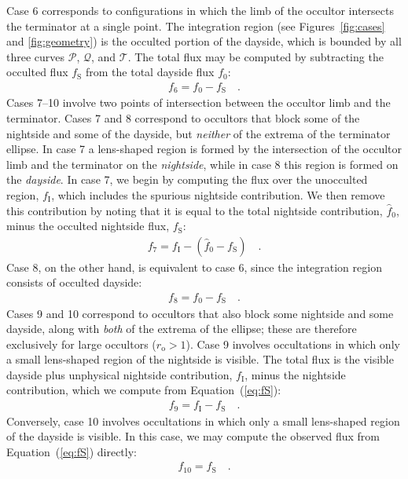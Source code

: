\documentclass[modern]{aastex62}
\begin{document}
Case 6 corresponds to configurations in which the limb of the occultor
intersects the terminator at a single point. The integration region
(see Figures~\ref{fig:cases} and \ref{fig:geometry}) is the occulted
portion of the dayside, which is bounded by all three curves $\mathcal{P}$, $\mathcal{Q}$, and $\mathcal{T}$.
The total flux may
be computed by subtracting the occulted flux $f_\mathrm{S}$ from the total dayside
flux $f_0$:
%
\begin{align}
    \label{eq:f6}
    f_6 = f_0 - f_\mathrm{S}
    \quad.
\end{align}
%
Cases 7--10 involve two points of intersection between the occultor limb and
the terminator.
%
Cases 7 and 8 correspond to occultors that block some of the
nightside and some of the dayside, but \emph{neither} of the extrema of the
terminator ellipse. In case 7 a lens-shaped region is formed by the
intersection of the occultor limb and the terminator on the
\emph{nightside}, while in case 8 this region is formed on the \emph{dayside}.
%
In case 7, we begin by computing the
flux over the unocculted region, $f_\mathrm{I}$, which includes the spurious
nightside contribution. We then remove this contribution by noting that it
is equal to the total nightside contribution, $\hat{f}_0$, minus the
occulted nightside flux, $f_\mathrm{S}$:
%
\begin{align}
    \label{eq:f7}
    f_7 = f_\mathrm{I} - (\hat{f}_0 - f_\mathrm{S})
    \quad.
\end{align}
%
Case 8, on the other hand, is equivalent to case 6, since
the integration region consists of occulted dayside:
%
\begin{align}
    \label{eq:f8}
    f_8 = f_0 - f_\mathrm{S}
    \quad.
\end{align}
%
Cases 9 and 10 correspond to occultors that also block some nightside and some
dayside, along with \emph{both} of the extrema of the ellipse; these are
therefore exclusively for large occultors ($r_\mathrm{o} > 1$). Case 9
involves occultations in which only a small lens-shaped region of the
nightside is visible. The total flux is the visible dayside plus unphysical
nightside contribution, $f_\mathrm{I}$, minus the nightside contribution, which we
compute from Equation~(\ref{eq:fS}):
%
\begin{align}
    \label{eq:f9}
    f_9 = f_\mathrm{I} - f_\mathrm{S}
    \quad.
\end{align}
%
Conversely, case 10 involves occultations in which only a small lens-shaped
region of the dayside is visible. In this case, we may compute the observed
flux from Equation~(\ref{eq:fS}) directly:
%
\begin{align}
    \label{eq:f10}
    f_{10} = f_\mathrm{S}
    \quad.
\end{align}
%
\end{document}
